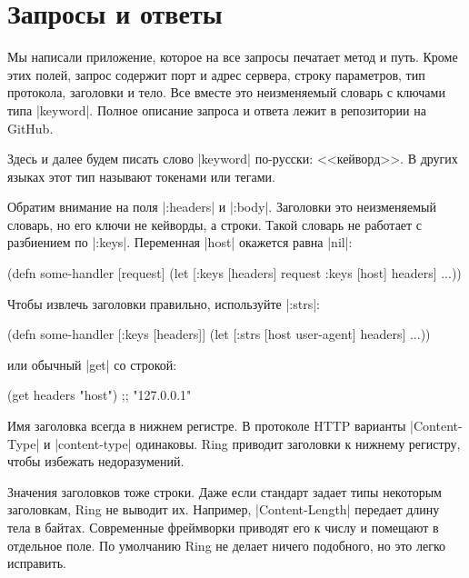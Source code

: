 \section{Запросы и ответы}

Мы написали приложение, которое на все запросы печатает метод и путь. Кроме этих
полей, запрос содержит порт и адрес сервера, строку параметров, тип протокола,
заголовки и тело. Все вместе это неизменяемый словарь с ключами типа
\spverb|keyword|. Полное описание запроса и ответа лежит в репозитории на
GitHub.

Здесь и далее будем писать слово \spverb|keyword| по-русски: <<кейворд>>. В
других языках этот тип называют токенами или тегами.

Обратим внимание на поля \spverb|:headers| и \spverb|:body|. Заголовки это
неизменяемый словарь, но его ключи не кейворды, а строки. Такой словарь не
работает с разбиением по \spverb|:keys|. Переменная \spverb|host| окажется равна
\spverb|nil|:

\begin{english}
  \begin{clojure}
(defn some-handler
  [request]
  (let [{:keys [headers]} request
        {:keys [host]} headers]
    ...))
  \end{clojure}
\end{english}

Чтобы извлечь заголовки правильно, используйте \spverb|:strs|:

\begin{english}
  \begin{clojure}
(defn some-handler
  [{:keys [headers]}]
  (let [{:strs [host user-agent]} headers]
    ...))
  \end{clojure}
\end{english}

\noindent
или обычный \spverb|get| со строкой:

\begin{english}
  \begin{clojure}
(get headers "host") ;; "127.0.0.1"
  \end{clojure}
\end{english}

Имя заголовка всегда в нижнем регистре. В протоколе HTTP варианты
\spverb|Content-Type| и \spverb|content-type| одинаковы. Ring приводит
заголовки к нижнему регистру, чтобы избежать недоразумений.

Значения заголовков тоже строки. Даже если стандарт задает типы некоторым
заголовкам, Ring не выводит их. Например, \spverb|Content-Length|
передает длину тела в байтах. Современные фреймворки приводят его к числу и
помещают в отдельное поле. По умолчанию Ring не делает ничего подобного, но это
легко исправить.

